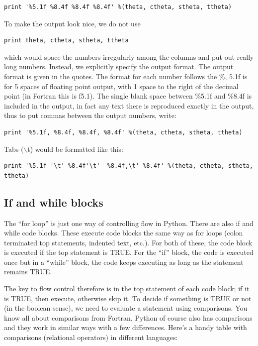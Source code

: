 \documentclass[11pt]{book}
\begin{document}
{{ \color{blue} \begin{verbatim}  
print '%5.1f %8.4f %8.4f %8.4f' %(theta, ctheta, stheta, ttheta)   
\end{verbatim}}
  
\noindent To make the output look nice, we do not use

{ \color{blue} \begin{verbatim}  
print theta, ctheta, stheta, ttheta
\end{verbatim}}

\noindent which would space the numbers irregularly among the columns and put out really long numbers.  Instead,
we explicitly specify the output format.   The output format is given in the quotes.  The format for each
number follows the \%, 5.1f is for 5 spaces of floating point output, with 1
space to the right of the decimal point (in Fortran this is f5.1).  The single
blank space between \%5.1f and \%8.4f is included in the output, in fact any
text there is reproduced exactly in the output, thus to put commas between
the output numbers, write:

{ \color{blue} \begin{verbatim}  
print '%5.1f, %8.4f, %8.4f, %8.4f' %(theta, ctheta, stheta, ttheta)   
\end{verbatim}}

\noindent Tabs ($\backslash$t) would be formatted like this:      

{ \color{blue} \begin{verbatim}  
print '%5.1f '\t' %8.4f'\t'  %8.4f,\t' %8.4f' %(theta, ctheta, stheta, ttheta) 
\end{verbatim}  }  
  
       
\subsection{If and while blocks}

The ``for loop'' is just one way of controlling flow in Python.  There are also {\color{blue}if}  and  {\color{blue}while} code blocks.  These execute code blocks  the same way as for loops (colon terminated top statements, indented text, etc.).  For both of these, the code block is executed if the top statement is  TRUE.  For the ``if'' block, the code is executed once but in a ``while'' block, the code keeps executing as long as the statement remains TRUE.  

The key to flow control therefore is in the top statement of each code block;  if it is TRUE, then execute, otherwise skip it.  To decide if something is TRUE or not (in the boolean sense), we need to evaluate a statement using comparisons.  You know all about comparisons from Fortran.  Python of course also has comparisons and they work in similar ways with a few differences. Here's a handy table with comparisons (relational operators) in different languages:

}
\end{document}
